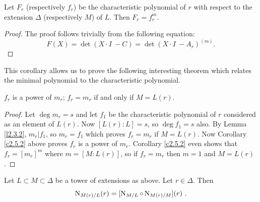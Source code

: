 \begin{coro}
\label{c2.5.2}
Let $F_{r}$ (respectively $f_{r}$) be the characteristic polynomial of $r$ with respect to the extension $\Delta$ (respectively $M$) of $L$. Then $F_{r}=f_{r}^{m}$.
\end{coro}

\begin{proof}
The proof follows trivially from the following equation:
\begin{equation}
F(X)=\det(X\cdot I\ -C)=\det(X\cdot I\ -A_{r})^{(m)}.
\end{equation}
\end{proof}

This corollary allows us to prove the following interesting theorem which relates the minimal polynomial to the characteristic polynomial.

\begin{theo}
\label{t2.5.4}
$f_{r}$ is a power of $m_{r}$; $f_{r}=m_{r}$ if and only if $M=L(r)$.
\end{theo}

\begin{proof}
Let $\deg m_{r}=s$ and let $f_{1}$ be the characteristic polynomial of $r$ considered as an element of $L(r)$. Now $[L(r):L]=s$, so $\deg f_{1}=s$ also. By Lemma \ref{l2.3.2}, $m_{r}|f_{1}$, so $m_{r}=f_{1}$ which proves $f_{r}=m_{r}$ if $M=L(r)$. Now Corollary \ref{c2.5.2} above proves $f_{r}$ is a power of $m_{r}$. Corollary \ref{c2.5.2} even shows that $f_{r}=[m_{r}]^{m}$ where $m=[M:L(r)]$, so if $f_{r}=m_{r}$ then $m=1$ and $M=L(r)$.
\end{proof}

\begin{prop}
\label{p2.5.9}
Let $ L\subset M\subset\Delta$ be a tower of extensions as above. Let $ r\in\Delta$. Then
$$
\operatorname{N}_{M(r)/L}(r)=[\operatorname{N}_{M/L}\circ \operatorname{N}_{M(r)/M}](r)\ .
$$
\end{prop}

